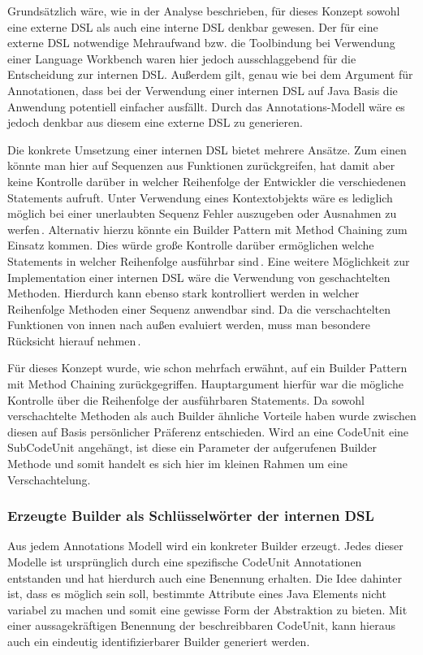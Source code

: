 \documentclass[12pt,oneside,a4paper,parskip]{scrbook}
\begin{document}
Grundsätzlich wäre, wie in der Analyse beschrieben,  für dieses Konzept sowohl eine externe DSL als auch eine interne DSL denkbar gewesen. Der für eine externe DSL notwendige Mehraufwand bzw. die Toolbindung bei Verwendung einer Language Workbench waren hier jedoch ausschlaggebend für die Entscheidung zur internen DSL. Außerdem gilt, genau wie bei dem Argument für Annotationen, dass bei der Verwendung einer internen DSL auf Java Basis die Anwendung potentiell einfacher ausfällt. Durch das Annotations-Modell wäre es jedoch denkbar aus diesem eine externe DSL zu generieren.

Die konkrete Umsetzung einer internen DSL bietet mehrere Ansätze. Zum einen könnte man hier auf Sequenzen aus Funktionen zurückgreifen, hat damit aber keine Kontrolle darüber in welcher Reihenfolge der Entwickler die verschiedenen Statements aufruft. Unter Verwendung eines Kontextobjekts wäre es lediglich möglich bei einer unerlaubten Sequenz Fehler auszugeben oder Ausnahmen zu werfen\,\cite[S. 351ff.]{fowler2010}. Alternativ hierzu könnte ein Builder Pattern mit Method Chaining zum Einsatz kommen. Dies würde große Kontrolle darüber ermöglichen welche Statements in welcher Reihenfolge ausführbar sind\,\cite[S. 343ff.]{fowler2010}. Eine weitere Möglichkeit zur Implementation einer internen DSL wäre die Verwendung von geschachtelten Methoden. Hierdurch kann ebenso stark kontrolliert werden in welcher Reihenfolge Methoden einer Sequenz anwendbar sind. Da die verschachtelten Funktionen von innen nach außen evaluiert werden, muss man besondere Rücksicht hierauf nehmen\,\cite[S. 357ff.]{fowler2010}.

Für dieses Konzept wurde, wie schon mehrfach erwähnt, auf ein Builder Pattern mit Method Chaining zurückgegriffen. Hauptargument hierfür war die mögliche Kontrolle über die Reihenfolge der ausführbaren Statements. Da sowohl verschachtelte Methoden als auch Builder ähnliche Vorteile haben wurde zwischen diesen auf Basis persönlicher Präferenz entschieden. Wird an eine CodeUnit eine SubCodeUnit angehängt, ist diese ein Parameter der aufgerufenen Builder Methode und somit handelt es sich hier im kleinen Rahmen um eine Verschachtelung.

\subsubsection{Erzeugte Builder als Schlüsselwörter der internen DSL}

Aus jedem Annotations Modell wird ein konkreter Builder erzeugt. Jedes dieser Modelle ist ursprünglich durch eine spezifische CodeUnit Annotationen entstanden und hat hierdurch auch eine Benennung erhalten. Die Idee dahinter ist, dass es möglich sein soll, bestimmte Attribute eines Java Elements nicht variabel zu machen und somit eine gewisse Form der Abstraktion zu bieten. Mit einer aussagekräftigen Benennung der beschreibbaren CodeUnit, kann hieraus auch ein eindeutig identifizierbarer Builder generiert werden.
\end{document}

